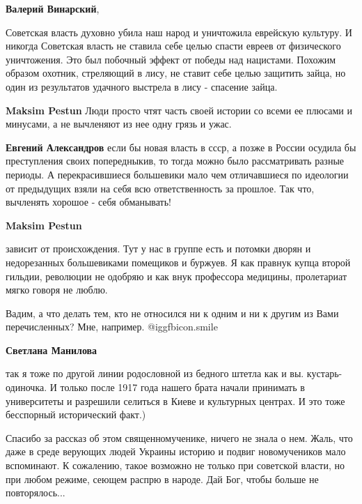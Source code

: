 \begin{itemize}
\begin{itemize}
\begin{itemize}
\textbf{Валерий Винарский}, 

Советская власть духовно убила наш народ и уничтожила еврейскую культуру. И
никогда Советская власть не ставила себе целью спасти евреев от физического
уничтожения. Это был побочный эффект от победы над нацистами. Похожим образом
охотник, стреляющий в лису, не ставит себе целью защитить зайца, но один из
результатов удачного выстрела в лису - спасение зайца.

\end{itemize} %

\textbf{Maksim Pestun} Люди просто чтят часть своей истории со всеми ее плюсами
и минусами, а не вычленяют из нее одну грязь и ужас.

\begin{itemize} %
\textbf{Евгений Александров} если бы новая власть в ссср, а позже в России осудила бы преступления своих попередныкив, то тогда можно было рассматривать разные периоды. А перекрасившиеся большевики мало чем отличавшиеся по идеологии от предыдущих взяли на себя всю ответственность за прошлое. Так что, вычленять хорошое - себя обманывать!
\end{itemize} %

\textbf{Maksim Pestun} 

зависит от происхождения. Тут у нас в группе есть и потомки дворян и
недорезанных большевиками помещиков и буржуев. Я как правнук купца второй
гильдии, революции не одобряю и как внук профессора медицины, пролетариат мягко
говоря не люблю.

\begin{itemize} %
Вадим, а что делать тем, кто не относился ни к одним и ни к другим из Вами перечисленных? Мне, например. @igg{fbicon.smile} 

\textbf{Светлана Манилова} 

так я тоже по другой линии родословной из бедного штетла как и вы.
кустарь-одиночка. И только после 1917 года нашего брата начали принимать в
университеты и разрешили селиться в Киеве и культурных центрах. И это тоже
бесспорный исторический факт.)

\end{itemize} %


\end{itemize} %


Спасибо за рассказ об этом священномученике, ничего не знала о нем. Жаль, что
даже в среде верующих людей Украины историю и подвиг новомучеников мало
вспоминают. К сожалению, такое возможно не только при советской власти, но при
любом режиме, сеющем распрю в народе. Дай Бог, чтобы больше не повторялось...


\end{itemize}
